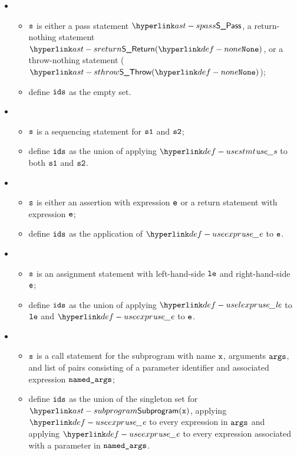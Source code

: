 \ProseParagraph
\OneApplies
\begin{itemize}
  \item {}
  \begin{itemize}
    \item $\texttt{s}$ is either a pass statement $\SPass$, a return-nothing statement $\SReturn(\None)$,
          or a throw-nothing statement ($\SThrow(\None)$);
    \item define $\texttt{ids}$ as the empty set.
  \end{itemize}

  \item {}
  \begin{itemize}
    \item $\texttt{s}$ is a sequencing statement for $\texttt{s1}$ and $\texttt{s2}$;
    \item define $\texttt{ids}$ as the union of applying $\usestmt$ to both $\texttt{s1}$ and $\texttt{s2}$.
  \end{itemize}

  \item {}
  \begin{itemize}
    \item $\texttt{s}$ is either an assertion with expression $\texttt{e}$ or a return statement with expression $\texttt{e}$;
    \item define $\texttt{ids}$ as the application of $\useexpr$ to $\texttt{e}$.
  \end{itemize}

  \item {}
  \begin{itemize}
    \item $\texttt{s}$ is an assignment statement with left-hand-side $\texttt{le}$ and right-hand-side $\texttt{e}$;
    \item define $\texttt{ids}$ as the union of applying $\uselexpr$ to $\texttt{le}$ and $\useexpr$ to $\texttt{e}$.
  \end{itemize}

  \item {}
  \begin{itemize}
    \item $\texttt{s}$ is a call statement for the subprogram with name $\texttt{x}$, arguments $\texttt{args}$, and list of
          pairs consisting of a parameter identifier and associated expression $\texttt{named\_args}$;
    \item define $\texttt{ids}$ as the union of the singleton set for $\Subprogram(\vx)$, applying $\useexpr$ to
          every expression in $\texttt{args}$ and applying $\useexpr$ to every expression associated with
          a parameter in $\texttt{named\_args}$.
  \end{itemize}


\end{itemize}
